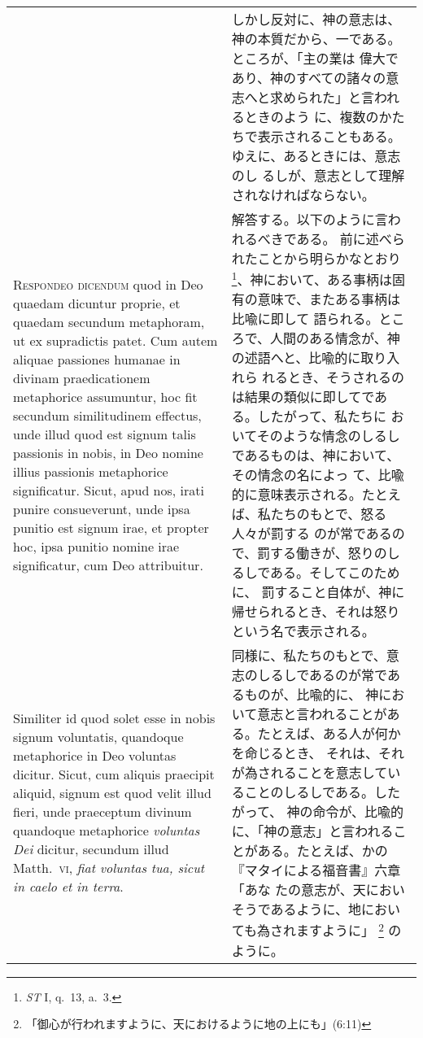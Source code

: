 \documentclass[10pt]{jsarticle} %
\begin{document}
\begin{longtable}{p{21em}p{21em}}
&

しかし反対に、神の意志は、神の本質だから、一である。ところが、「主の業は
 偉大であり、神のすべての諸々の意志へと求められた」と言われるときのよう
 に、複数のかたちで表示されることもある。ゆえに、あるときには、意志のし
 るしが、意志として理解されなければならない。


\\


{\scshape Respondeo dicendum} quod in Deo quaedam
dicuntur proprie, et quaedam secundum metaphoram, ut ex supradictis
patet. Cum autem aliquae passiones humanae in divinam praedicationem
metaphorice assumuntur, hoc fit secundum similitudinem effectus, unde
illud quod est signum talis passionis in nobis, in Deo nomine illius
passionis metaphorice significatur. Sicut, apud nos, irati punire
consueverunt, unde ipsa punitio est signum irae, et propter hoc, ipsa
punitio nomine irae significatur, cum Deo attribuitur. 


&

解答する。以下のように言われるべきである。
前に述べられたことから明らかなとおり\footnote{{\itshape ST} I, q.~13,
 a.~3.}、神において、ある事柄は固有の意味で、またある事柄は比喩に即して
 語られる。ところで、人間のある情念が、神の述語へと、比喩的に取り入れら
 れるとき、そうされるのは結果の類似に即してである。したがって、私たちに
 おいてそのような情念のしるしであるものは、神において、その情念の名によっ
 て、比喩的に意味表示される。たとえば、私たちのもとで、怒る人々が罰する
 のが常であるので、罰する働きが、怒りのしるしである。そしてこのために、
 罰すること自体が、神に帰せられるとき、それは怒りという名で表示される。
 
\\


Similiter id quod
solet esse in nobis signum voluntatis, quandoque metaphorice in Deo
voluntas dicitur. Sicut, cum aliquis praecipit aliquid, signum est quod
velit illud fieri, unde praeceptum divinum quandoque metaphorice
{\itshape voluntas Dei} dicitur, secundum illud Matth.~{\scshape vi}, {\itshape fiat voluntas tua, sicut
in caelo et in terra}. 

&

同様に、私たちのもとで、意志のしるしであるのが常であるものが、比喩的に、
 神において意志と言われることがある。たとえば、ある人が何かを命じるとき、
 それは、それが為されることを意志していることのしるしである。したがって、
 神の命令が、比喩的に、「神の意志」と言われることがある。たとえば、かの
 『マタイによる福音書』六章「あな
 たの意志が、天においそうであるように、地においても為されますように」
 \footnote{「御心が行われますように、天におけるように地の上にも」(6:11)}
 のように。



\end{longtable}
\end{document}
